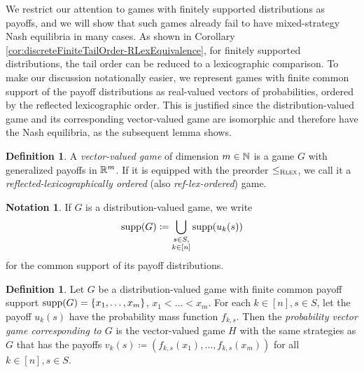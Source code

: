 \documentclass[a4paper]{scrreprt}
\theoremstyle{definition}
\newtheorem{defn}[thm]{Definition} %
\newtheorem{notation}[thm]{Notation}
\begin{document}
    We restrict our attention to games with finitely supported distributions as payoffs, and we will show that such games already fail to have mixed-strategy Nash equilibria in many cases.
    As shown in Corollary \ref{cor:discreteFiniteTailOrder-RLexEquivalence}, for finitely supported distributions, the tail order can be reduced to a lexicographic comparison.
    To make our discussion notationally easier, we represent games with finite common support of the payoff distributions as real-valued vectors of probabilities, ordered by the reflected lexicographic order. This is justified since the distribution-valued game and its corresponding vector-valued game are isomorphic and therefore have the Nash equilibria, as the subsequent lemma shows.
    \begin{defn}
        A \emph{vector-valued game} of dimension $m \in \mathbb{N}$ is a game $G$ with generalized payoffs in $\mathbb{R}^m$.
        If it is equipped with the preorder $\leq_{\textsc{Rlex}}$, we call it a \emph{reflected-lexicographically ordered} (also \emph{ref-lex-ordered}) game.
        \label{def:vectorValuedGame}
    \end{defn}

    \begin{notation}
        If $G$ is a distribution-valued game, we write
        \begin{gather*}
            \operatorname{supp}(G) \coloneqq \bigcup\limits_{\substack{s \in S,\\k \in [n]}} \operatorname{supp}(u_k(s))
        \end{gather*}
        for the common support of its payoff distributions.
    \end{notation}

    \begin{defn}
        Let $G$ be a distribution-valued game with finite common payoff support $\operatorname{supp}(G) = \{x_1, \dots, x_m\}$, $x_1 < \dots < x_m$.
        For each $k \in [n], s \in S$, let the payoff $u_k(s)$ have the probability mass function $f_{k, s}$.
        Then the \emph{probability vector game corresponding to $G$} is the vector-valued game $H$ with the same strategies as $G$ that has the payoffs $v_k(s) \coloneqq (f_{k, s}(x_1), \dots, f_{k, s}(x_m))$ for all $k \in [n], s \in S$.
    \end{defn}
\end{document}
